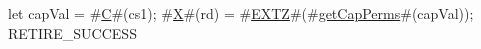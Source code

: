 let capVal = #\hyperref[sailRISCVzC]{C}#(cs1);
#\hyperref[sailRISCVzX]{X}#(rd) = #\hyperref[sailRISCVzEXTZ]{EXTZ}#(#\hyperref[sailRISCVzgetCapPerms]{getCapPerms}#(capVal));
RETIRE_SUCCESS
